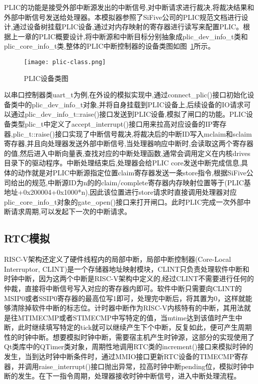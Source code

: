 PLIC的功能是接受外部中断源发出的中断信号,对中断请求进行裁决,将裁决结果和外部中断信号发送给处理器。本模拟器参照了SiFive公司的PLIC规范文档进行设计,通过设备树挂载PLIC设备,通过对内存映射的寄存器进行读写来配置PLIC。根据上一章的PLIC概要设计,将中断源和中断目标分别抽象成plic\_dev\_info\_t类和plic\_core\_info\_t类,整体的PLIC中断控制器的设备类图如图~\ref{fig:plic-class}所示。
\begin{figure}[H]
    \centering
    \texttt{[image: plic-class.png]}
    \caption{PLIC设备类图}
    \label{fig:plic-class}
\end{figure}
以串口控制器类uart\_t为例,在外设的模拟实现中,通过connect\_plic()接口初始化设备类中的plic\_dev\_info\_t对象,并将自身挂载到PLIC设备上,后续设备的IO请求可以通过plic\_dev\_info\_t::raise()接口发送到PLIC设备,模拟了闸口的功能。PLIC设备类型plic\_t中定义了accept\_interrupt()接口用来拉高对应设备的IP寄存器,plic\_t::raise()接口实现了中断信号裁决,将裁决后的中断ID写入mclaim和sclaim寄存器,并且向处理器发送外部中断信号,当处理器响应中断时,会读取这两个寄存器的值,然后进入中断向量表,查找对应的中断处理函数,通常会调用定义在内核drives目录下的驱动程序。中断处理结束后,处理器会给PLIC core发送中断完成信息,具体的动作就是对PLIC中断源指定位置claim寄存器发送一条store指令,根据SiFive公司给出的规范,中断源ID为n的的claim/complete寄存器内存映射位置等于(PLIC基地址+0x200004+0x1000*n),因此该位置进行store请求时直接调用处理器对应plic\_core\_info\_t对象的gate\_open()接口来打开闸口。此时PLIC完成一次外部中断请求周期,可以发起下一次的中断请求。




\subsection{RTC模拟}

RISC-V架构还定义了硬件线程内的局部中断，局部中断控制器(Core-Local Interruptor, CLINT)是一个存储器地址映射模块，CLINT只负责处理软件中断和时钟中断，因为这两个中断是RISC-V架构中定义的,经过CLINT不需要进行任何的仲裁，直接将中断信号写入对应的寄存器内即可。软件中断只需要向CLINT的MSIP0或者SSIP0寄存器的最高位写1即可，处理完中断后，将其置为0，这样就能够清除掉软件中断的标志位。计时器中断作为RISC-V内核特有的中断，其用法就是往MTIMECMP或者STIMECMP中写特定的值，当mtime达到该值时产生中断，此时继续填写特定的tick就可以继续产生下个中断，反复如此，便可产生周期性的时钟中断。想要模拟时钟中断，需要宿主机产生时钟源，这部分的实现使用了Qt类库中的QTimer类对象，周期性地调用RTC类的increment()接口来模拟时钟的发生，当到达时钟中断条件时，通过MMIO接口更新RTC设备的TIMECMP寄存器，并调用raise\_interrupt()接口抛出异常，拉高时钟中断pending位，模拟时钟中断的发生。在下一指令周期，处理器接收时钟中断信号，进入中断处理流程。

